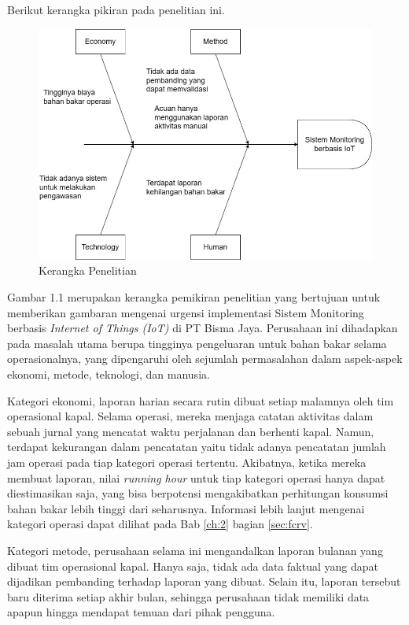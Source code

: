 Berikut kerangka pikiran pada penelitian ini.

\begin{figure}[ht]
    \includegraphics[width=1\linewidth, center]{images/pendahuluan/fig-framework-penelitian.jpg}
    \caption{Kerangka Penelitian}
    \label{fig:thinking-framework}
\end{figure}

\newpage

Gambar 1.1  merupakan kerangka pemikiran penelitian yang bertujuan untuk memberikan gambaran mengenai urgensi implementasi Sistem Monitoring berbasis \textit{Internet of Things (IoT)} di PT Bisma Jaya. Perusahaan ini dihadapkan pada masalah utama berupa tingginya pengeluaran untuk bahan bakar selama operasionalnya, yang dipengaruhi oleh sejumlah permasalahan dalam aspek-aspek ekonomi, metode, teknologi, dan manusia.

Kategori ekonomi, laporan harian secara rutin dibuat setiap malamnya oleh tim operasional kapal. Selama operasi, mereka menjaga catatan aktivitas dalam sebuah jurnal yang mencatat waktu perjalanan dan berhenti kapal. Namun, terdapat kekurangan dalam pencatatan yaitu tidak adanya pencatatan jumlah jam operasi pada tiap kategori operasi tertentu. Akibatnya, ketika mereka membuat laporan, nilai \textit{running hour} untuk tiap kategori operasi hanya dapat diestimasikan saja, yang bisa berpotensi mengakibatkan perhitungan konsumsi bahan bakar lebih tinggi dari seharusnya. Informasi lebih lanjut mengenai kategori operasi dapat dilihat pada Bab \ref{ch:2} bagian \ref{sec:fcrv}.

Kategori metode, perusahaan selama ini mengandalkan laporan bulanan yang dibuat tim operasional kapal. Hanya saja, tidak ada data faktual yang dapat dijadikan pembanding terhadap laporan yang dibuat. Selain itu, laporan tersebut baru diterima setiap akhir bulan, sehingga perusahaan tidak memiliki data apapun hingga mendapat temuan dari pihak pengguna.

